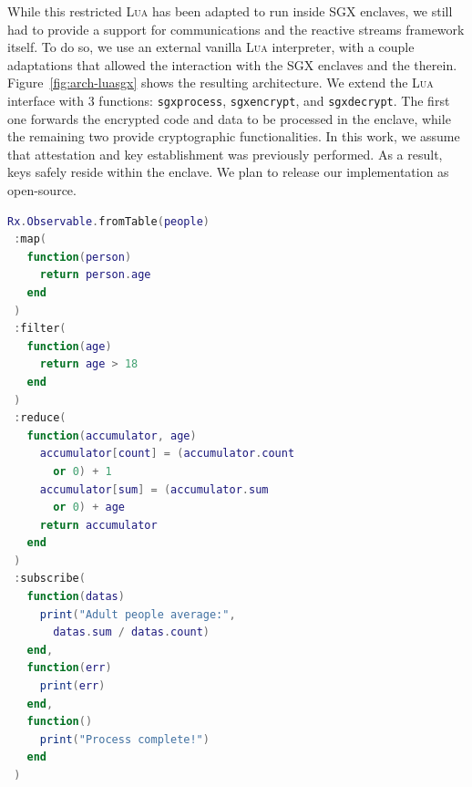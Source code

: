 While this restricted \textsc{Lua} has been adapted to run inside SGX enclaves, we still had to provide a support for communications and the reactive streams framework itself.
To do so, we use an external vanilla \textsc{Lua} interpreter, with a couple adaptations that allowed the interaction with the SGX enclaves and the \luavm therein.
Figure~\ref{fig:arch-luasgx} shows the resulting architecture.
We extend the \textsc{Lua} interface with 3 functions: \texttt{sgxprocess}, \texttt{sgxencrypt}, and \texttt{sgxdecrypt}.
The first one forwards the encrypted code and data to be processed in the enclave, while the remaining two provide cryptographic functionalities.
In this work, we assume that attestation and key establishment was previously performed.
As a result, keys safely reside within the enclave.
We plan to release our implementation as open-source.

\newpage

\begin{minipage}{\linewidth}
\begin{lstlisting}[language=LUA,caption={Example of process pipeline with RxLua.},label=pipeline-example]
Rx.Observable.fromTable(people)
 :map(
   function(person)
     return person.age
   end
 )
 :filter(
   function(age)
     return age > 18
   end
 )
 :reduce(
   function(accumulator, age)
     accumulator[count] = (accumulator.count
       or 0) + 1
     accumulator[sum] = (accumulator.sum
       or 0) + age
     return accumulator
   end
 )
 :subscribe(
   function(datas)
     print("Adult people average:",
       datas.sum / datas.count)
   end,
   function(err)
     print(err)
   end,
   function()
     print("Process complete!")
   end
 )
\end{lstlisting}
\end{minipage}
